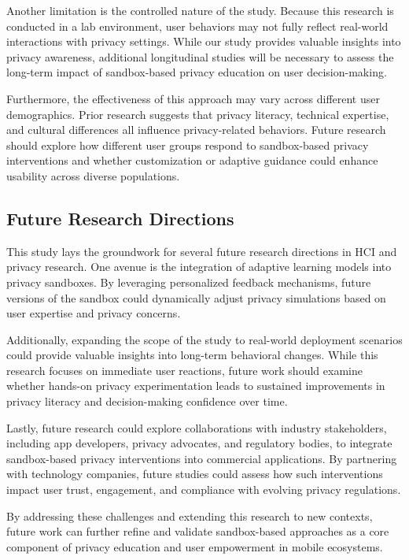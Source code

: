 \documentclass[acmlarge, nonacm]{acmart}
\begin{document}
Another limitation is the controlled nature of the study. Because this research is conducted in a lab environment, user behaviors may not fully reflect real-world interactions with privacy settings. While our study provides valuable insights into privacy awareness, additional longitudinal studies will be necessary to assess the long-term impact of sandbox-based privacy education on user decision-making.

Furthermore, the effectiveness of this approach may vary across different user demographics. Prior research suggests that privacy literacy, technical expertise, and cultural differences all influence privacy-related behaviors. Future research should explore how different user groups respond to sandbox-based privacy interventions and whether customization or adaptive guidance could enhance usability across diverse populations.



\subsection{Future Research Directions}

This study lays the groundwork for several future research directions in HCI and privacy research. One avenue is the integration of adaptive learning models into privacy sandboxes. By leveraging personalized feedback mechanisms, future versions of the sandbox could dynamically adjust privacy simulations based on user expertise and privacy concerns.

Additionally, expanding the scope of the study to real-world deployment scenarios could provide valuable insights into long-term behavioral changes. While this research focuses on immediate user reactions, future work should examine whether hands-on privacy experimentation leads to sustained improvements in privacy literacy and decision-making confidence over time.

Lastly, future research could explore collaborations with industry stakeholders, including app developers, privacy advocates, and regulatory bodies, to integrate sandbox-based privacy interventions into commercial applications. By partnering with technology companies, future studies could assess how such interventions impact user trust, engagement, and compliance with evolving privacy regulations.

By addressing these challenges and extending this research to new contexts, future work can further refine and validate sandbox-based approaches as a core component of privacy education and user empowerment in mobile ecosystems.
\end{document}

